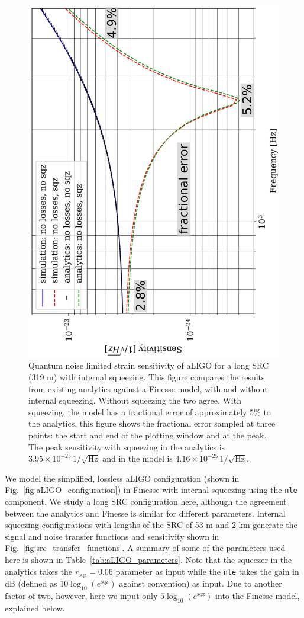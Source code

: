 \documentclass[aps,pra,superscriptaddress,reprint,nofootinbib]{revtex4-1}
\newcommand{\code}[1]{\texttt{#1}}
\begin{document}
\begin{figure}[ht]
	\begin{center}
	\includegraphics[height=0.65\textwidth, angle=-90]{figures/sqz_aLIGO_analytics_v_simulation_with_fractional_errors.pdf}
	\end{center}
	\caption{Quantum noise limited strain sensitivity of aLIGO for a long SRC (319 m) with internal squeezing. This figure compares the results from existing analytics against a Finesse model, with and without internal squeezing. Without squeezing the two agree. With squeezing, the model has a fractional error of approximately $5\%$ to the analytics, this figure shows the fractional error sampled at three points: the start and end of the plotting window and at the peak. The peak sensitivity with squeezing in the analytics is $3.95 \times 10^{-25}\, 1/\sqrt{\mathrm{Hz}}$ and in the model is $4.16 \times 10^{-25} \, 1/\sqrt{\mathrm{Hz}}$.}
	\label{fig:sqz_aLIGO_analytics_v_simulation}
\end{figure}

We model the simplified, lossless aLIGO configuration (shown in Fig.~\ref{fig:aLIGO_configuration}) in Finesse with internal squeezing using the \code{nle} component. We study a long SRC configuration here, although the agreement between the analytics and Finesse is similar for different parameters. Internal squeezing configurations with lengths of the SRC of 53 m and 2 km generate the signal and noise transfer functions and sensitivity shown in Fig.~\ref{fig:src_transfer_functions}. A summary of some of the parameters used here is shown in Table~\ref{tab:aLIGO_parameters}. Note that the squeezer in the analytics takes the $r_\mathrm{sqz} = 0.06$ parameter as input while the \code{nle} takes the gain in dB (defined as $10 \log_{10}(e^\mathrm{sqz})$ against convention) as input. Due to another factor of two, however, here we input only $5 \log_{10}(e^\mathrm{sqz})$ into the Finesse model, explained below.
\end{document}
